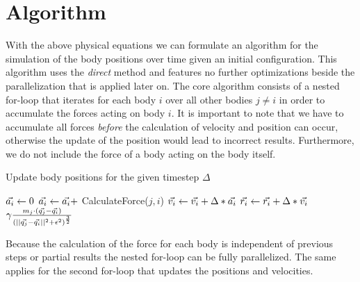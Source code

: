 \documentclass[a4paper,11pt]{scrartcl} %
\newcommand*{\vv}[1]{\vec{\mkern0mu#1}}
\begin{document}
\section{Algorithm}
With the above physical equations we can formulate an algorithm for the simulation of the body positions over time given an initial configuration. This algorithm uses the \textit{direct} method and features no further optimizations beside the parallelization that is applied later on. The core algorithm consists of a nested for-loop that iterates for each body $i$ over all other bodies $j \neq i$ in order to accumulate the forces acting on body $i$. It is important to note that we have to accumulate all forces \textit{before} the calculation of velocity and position can occur, otherwise the update of the position would lead to incorrect results. Furthermore, we do not include the force of a body acting on the body itself.
\begin{algorithm}[H]
\caption{Update body positions for the given timestep $\Delta$}
\begin{algorithmic}[1]
      \State $\vv{a_i} \gets 0$ 
        \State $\vv{a_i} \gets \vv{a_i} + $ CalculateForce($j,i$)
      \EndFor
   \EndFor
      \State $\vv{v_i} \gets \vv{v_i} + \Delta * \vv{a_i}$ 
      \State $\vv{r_i} \gets \vv{r_i} + \Delta * \vv{v_i}$ 
   \EndFor
\EndProcedure\\
	\State \Return $\gamma \frac{m_j \cdot (\vv{q_j} - \vv{q_i})}{(||\vv{q_j} - \vv{q_i}||^2 + \epsilon^2)^\frac{3}{2}}$
\EndProcedure
\end{algorithmic}
\label{alg:core}
\end{algorithm}

Because the calculation of the force for each body is independent of previous steps or partial results the nested for-loop can be fully parallelized. The same applies for the second for-loop that updates the positions and velocities.
\end{document}
